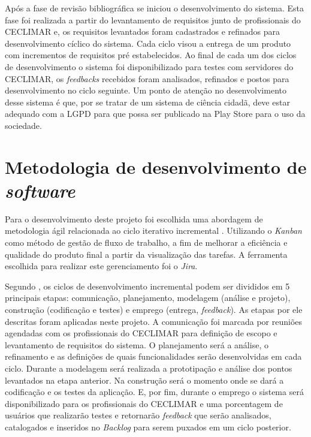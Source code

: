 Após a fase de revisão bibliográfica se iniciou o desenvolvimento do sistema. Esta fase foi realizada a 
partir do levantamento de requisitos junto de profissionais do CECLIMAR e, os requisitos levantados foram 
cadastrados e refinados para desenvolvimento cíclico do sistema. Cada ciclo visou a entrega de um produto 
com incrementos de requisitos pré estabelecidos. Ao final de cada um dos ciclos de desenvolvimento o sistema 
foi disponibilizado para testes com servidores do CECLIMAR, os \textit{feedbacks} recebidos foram analisados, 
refinados e postos para desenvolvimento no ciclo seguinte. Um ponto de atenção no desenvolvimento desse 
sistema é que, por se tratar de um sistema de ciência cidadã, deve estar adequado com a LGPD para que possa 
ser publicado na Play Store para o uso da sociedade.

\section{Metodologia de desenvolvimento de \textit{software}}\label{sec:metodologia-desenv-software}
Para o desenvolvimento deste projeto foi escolhida uma abordagem de metodologia ágil relacionada 
ao ciclo iterativo incremental \cite{pressman2011engenharia}. Utilizando o \textit{Kanban} como método de gestão de fluxo de trabalho, a 
fim de melhorar a eficiência e qualidade do produto final a partir da visualização das tarefas. A 
ferramenta escolhida para realizar este gerenciamento foi o \textit{Jira}.

Segundo , os ciclos de desenvolvimento incremental podem ser 
divididos em 5 principais etapas: comunicação, planejamento, modelagem (análise e projeto), construção 
(codificação e testes) e emprego (entrega, \textit{feedback}). As etapas por ele descritas foram 
aplicadas neste projeto.
A comunicação foi marcada por reuniões agendadas com os profissionais do CECLIMAR para definição de
 escopo e levantamento de requisitos do sistema. O planejamento será a análise, o refinamento e as 
 definições de quais funcionalidades serão desenvolvidas em cada ciclo. Durante a modelagem será 
 realizada a prototipação e análise dos pontos levantados na etapa anterior. Na construção será o 
 momento onde se dará a codificação e os testes da aplicação. E, por fim, durante o emprego o sistema 
 será disponibilizado para os profissionais do CECLIMAR e uma porcentagem de usuários que realizarão 
 testes e retornarão \textit{feedback} que serão analisados, catalogados e inseridos no \textit{Backlog} 
 para serem puxados em um ciclo posterior.

